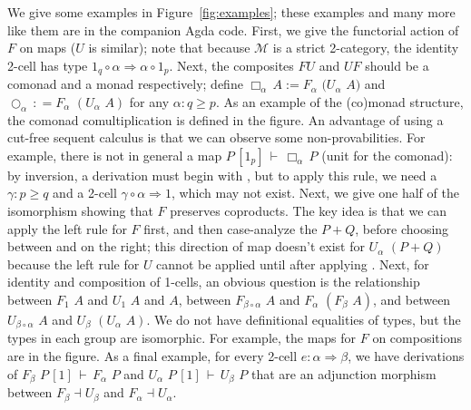 \documentclass{drl-common/llncs}
\newcommand{\M}{\ensuremath{\mathcal{M}}}
\newcommand{\la}{\ensuremath{\dashv}}
\newcommand{\tc}[2]{\ensuremath{#1 \Rightarrow #2}}
\newcommand\compo[2]{\ensuremath{#1 \circ #2}}
\newcommand\F[2]{\ensuremath{F_{#1} \,\, #2}}
\newcommand\U[2]{\ensuremath{U_{#1} \,\, #2}}
\newcommand\coprd[2]{\ensuremath{#1 + #2}}
\newcommand\seq[3]{\ensuremath{#1 \, [ #2 ] \, \vdash \, #3}}
\renewcommand\irl[1]{\dsd{#1}}
\newcommand\Bx[2]{\ensuremath{\Box_{#1} \, {#2}}}
\newcommand\Crc[2]{\ensuremath{\bigcirc_{#1} \, {#2}}}
\begin{document}
We give some examples in Figure~\ref{fig:examples}; these examples and
many more like them are in the companion Agda code.  First, we give the
functorial action of $F$ on maps ($U$ is similar); note that because
\M\/ is a strict 2-category, the identity 2-cell has type
\tc{\compo{1_q} \alpha}{\compo {\alpha} {1_p}}.  Next, the composites
$FU$ and $UF$ should be a comonad and a monad respectively; define $\Bx
\alpha A := \F \alpha (\U \alpha A)$ and $\Crc{\alpha} :=
\F{\alpha}{(\U{\alpha}{A})}$ for any $\alpha : q \ge p$.  As an example
of the (co)monad structure, the comonad comultiplication is defined in
the figure.  An advantage of using a cut-free sequent calculus is that
we can observe some non-provabilities.  For example, there is not in
general a map \seq{P}{1_p}{\Bx{\alpha}{P}} (unit for the comonad): by
inversion, a derivation must begin with \irl{FR}, but to apply this
rule, we need a $\gamma : p \ge q$ and a 2-cell
$\tc{\compo{\gamma}{\alpha}}{1}$, which may not exist.  Next, we give
one half of the isomorphism showing that $F$ preserves coproducts.  The
key idea is that we can apply the left rule for $F$ first, and then
case-analyze the $\coprd{P}{Q}$, before choosing between \irl{Inl} and
\irl{Inr} on the right; this direction of map doesn't exist for
\U{\alpha}{(\coprd{P}{Q})} because the left rule for $U$ cannot be
applied until after applying \irl{UR}.  Next, for identity and
composition of 1-cells, an obvious question is the relationship between
$\F 1 A$ and $\U 1 A$ and $A$, between $\F {\compo{\beta}{\alpha}} A$
and $\F \alpha {(\F \beta A)}$, and between $\U {\compo{\beta}{\alpha}}
A$ and $\U \beta {(\U \alpha A)}$.  We do not have definitional
equalities of types, but the types in each group are isomorphic.  For
example, the maps for $F$ on compositions are in the figure.  As a final
example, for every 2-cell $e : \tc \alpha \beta$, we have derivations of
\seq{\F \beta P}{1}{\F \alpha P} and \seq{\U \alpha P}{1}{\U \beta P}
that are an adjunction morphism between $F_\beta \la U_\beta$ and
$F_\alpha \la U_\alpha$.
\end{document}
